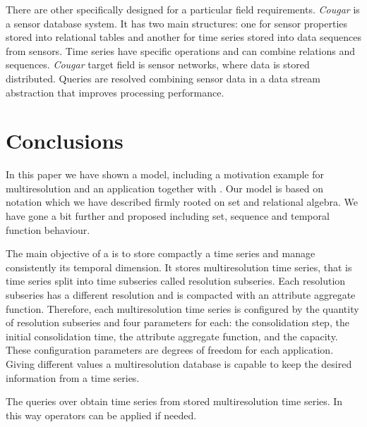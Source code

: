 There are other  specifically designed for a particular
field requirements.  \emph{Cougar}
\cite{bonnet01} is a sensor database system. It has two main
structures: one for sensor properties stored into relational tables
and another for time series stored into data sequences from
sensors. Time series have specific operations and can combine
relations and sequences. \emph{Cougar} target field is sensor networks, where
data is stored distributed. Queries are resolved combining
sensor data in a data stream abstraction that improves processing
performance.




\section{Conclusions}
\label{sec:concl-future-work}


In this paper we have shown a  model, including a
motivation example for multiresolution and an application together
with . Our  model is based on 
notation which we have described firmly rooted on set and relational
algebra. We have gone a bit further and proposed  including
set, sequence and temporal function behaviour.



The main objective of a  is to store compactly a time
series and manage consistently its temporal dimension.  It stores
multiresolution time series, that is time series split into time
subseries called resolution subseries.  Each resolution subseries has
a different resolution and is compacted with an attribute aggregate
function. Therefore, each multiresolution time series is configured by
the quantity of resolution subseries and four parameters for each: the
consolidation step, the initial consolidation time, the attribute
aggregate function, and the capacity.  These configuration parameters
are degrees of freedom for each application. Giving different
values a multiresolution database is capable to keep the desired
information from a time series.



The queries over  obtain time series from stored
multiresolution time series. In this way  operators can be
applied if needed.


